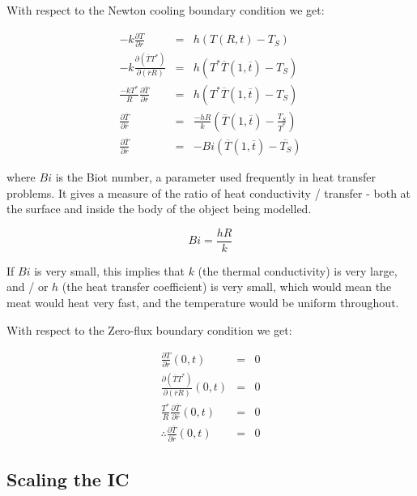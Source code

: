 \documentclass{report}
\begin{document}
With respect to the Newton cooling boundary condition we get:\bigskip

\begin{eqnarray*} 
                                        -k \frac{\partial T}{\partial r} & = & h (T(R, t) - T_S) \\
        -k \frac{\partial (\overline{T} T^*)}{\partial (\overline{r} R)} & = & h (T^* \overline{T}(1, \overline{t}) - T_S) \\
   \frac{- k T^*}{R} \frac{\partial \overline{T}}{\partial \overline{r}} & = & h (T^* \overline{T}(1, \overline{t}) - T_S) \\
                     \frac{\partial \overline{T}}{\partial \overline{r}} & = & \frac{- h R}{k} (\overline{T}(1, \overline{t}) - \frac{T_S}{T^*}) \\
                     \frac{\partial \overline{T}}{\partial \overline{r}} & = & -Bi (\overline{T}(1, \overline{t}) - \overline{T_S})
\end{eqnarray*}\medskip

where $Bi$ is the Biot number, a parameter used frequently in heat transfer problems. It gives a 
measure of the ratio of heat conductivity / transfer - both at the surface and inside the body of 
the object being modelled.\bigskip

\[
Bi = \frac{h R}{k} 
\]\medskip

If $Bi$ is very small, this implies that $k$ (the thermal conductivity) is very large, and / or $h$ 
(the heat transfer coefficient) is very small, which would mean the meat would heat very fast, and the 
temperature would be uniform throughout.\bigskip

With respect to the Zero-flux boundary condition we get:\bigskip

\begin{eqnarray*}  
                                    \frac{\partial T}{\partial r}(0, t) & = & 0 \\
    \frac{\partial (\overline{T} T^*)}{\partial (\overline{r} R)}(0, t) & = & 0 \\
\frac{T^*}{R} \frac{\partial \overline{T}}{\partial \overline{r}}(0, t) & = & 0 \\
   \therefore \frac{\partial \overline{T}}{\partial \overline{r}}(0, t) & = & 0 
\end{eqnarray*} 


\subsection{Scaling the IC}
\end{document}
